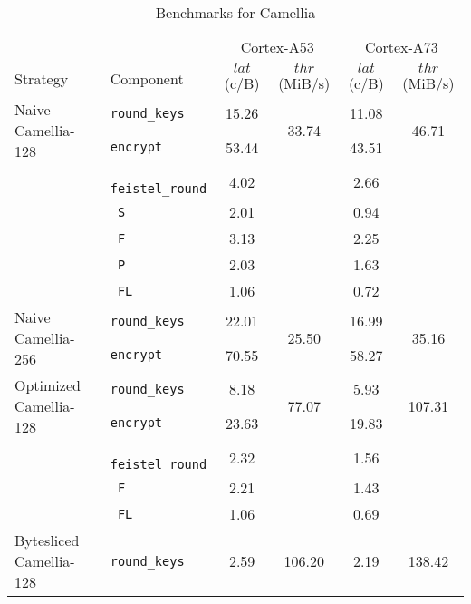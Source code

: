 \begin{table}[h!]
    \centering
    \caption{Benchmarks for Camellia}
    \scriptsize
    \begin{tabular}{llcccc}
        \toprule
        & & \multicolumn{2}{c}{Cortex-A53} & \multicolumn{2}{c}{Cortex-A73} \\
        \cmidrule(lr){3-4}\cmidrule(lr){5-6}
        Strategy & Component & $lat$ (c/B) & $thr$ (MiB/s) & $lat$ (c/B) & $thr$ (MiB/s) \\
        \midrule
        \multirow{2}{*}{Naive Camellia-128} & \texttt{round\_keys} & 15.26 & \multirow{2}{*}{33.74} & 11.08 & \multirow{2}{*}{46.71} \\
                                                & \texttt{encrypt} & 53.44 & &  43.51 & \\
        \cmidrule(lr){2-2}
                                                & \texttt{ feistel\_round} & 4.02 & & 2.66 & \\
                                                & \texttt{ S} & 2.01 & & 0.94 & \\
                                                & \texttt{ F} & 3.13 & & 2.25 & \\
                                                & \texttt{ P} & 2.03 & & 1.63 & \\
                                                & \texttt{ FL} & 1.06 & & 0.72 & \\
        \midrule
        \multirow{2}{*}{Naive Camellia-256} & \texttt{round\_keys} & 22.01 & \multirow{2}{*}{25.50} & 16.99 & \multirow{2}{*}{35.16} \\
                                                 & \texttt{encrypt} & 70.55 & & 58.27 & \\
        \midrule
        \multirow{2}{*}{Optimized Camellia-128} & \texttt{round\_keys} & 8.18 & \multirow{2}{*}{77.07} & 5.93 & \multirow{2}{*}{107.31} \\
                                                & \texttt{encrypt} & 23.63 & & 19.83 & \\
        \cmidrule(lr){2-2}
                                                & \texttt{ feistel\_round} & 2.32 & & 1.56 & \\
                                                & \texttt{ F} & 2.21 & & 1.43 & \\
                                                & \texttt{ FL} & 1.06 & & 0.69 & \\
        \midrule
        \multirow{2}{*}{Bytesliced Camellia-128} & \texttt{round\_keys} & 2.59 & \multirow{2}{*}{106.20} & 2.19 & \multirow{2}{*}{138.42} \\

\end{tabular}
\end{table}
